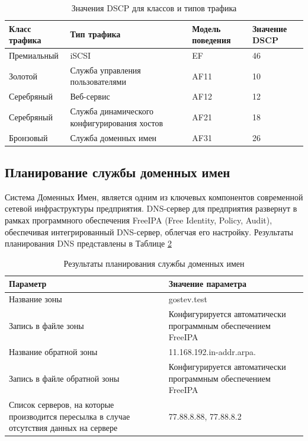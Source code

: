 \documentclass[14pt, a4paper]{extarticle}
\numberwithin{equation}{section}
\begin{document}
\begin{table}[H]
\centering
\small
\caption{Значения DSCP для классов и типов трафика}
\label{table:qos}
\begin{tabular}{|m{3cm}|m{3.5cm}|m{3cm}|m{3cm}|}
\hline
\textbf{Класс трафика} & \textbf{Тип трафика} & \textbf{Модель поведения} & \textbf{Значение DSCP} \\
\hline
Премиальный & iSCSI & EF & 46 \\
\hline
Золотой & Служба управления пользователями & AF11 & 10 \\
\hline
Серебряный & Веб-сервис & AF12 & 12 \\
\hline
Серебряный & Служба динамического конфигурирования хостов & AF21 & 18 \\
\hline
Бронзовый & Служба доменных имен & AF31 & 26 \\
\hline
\end{tabular}
\end{table}



\subsection{Планирование службы доменных имен}
Система Доменных Имен, является одним из ключевых компонентов современной 
сетевой инфраструктуры предприятия. 
DNS-сервер для предприятия развернут в рамках программного
обеспечения FreeIPA (Free Identity, Policy, Audit), обеспечивая интегрированный
DNS-сервер, облегчая его настройку.
Результаты планирования DNS представлены в Таблице \ref{table:dns_plan}

\begin{table}[H]
\centering
\small
\label{table:dns_plan}
\caption{Результаты планирования службы доменных имен}
\begin{tabular}{|m{6cm}|m{10cm}|}
\hline
\textbf{Параметр} & \textbf{Значение параметра} \\
\hline
Название зоны &  gostev.test \\
\hline
Запись в файле зоны &  Конфигурируется автоматически программным обеспечением FreeIPA\\
\hline
Название обратной зоны &  11.168.192.in-addr.arpa.\\
\hline
Запись в файле обратной зоны &  Конфигурируется автоматически программным обеспечением FreeIPA\\
\hline
Список серверов, на которые производится пересылка в случае отсутствия данных на сервере &  77.88.8.88, 77.88.8.2\\
\hline
\end{tabular}
\end{table}
\end{document}
